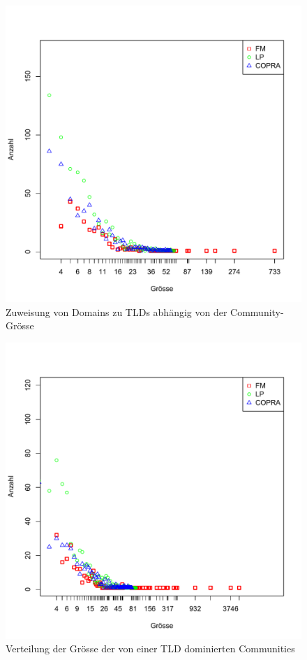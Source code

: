 \begin{figure}[h]
  \centering
  \includegraphics[scale=0.8]{images/tld_sure_dist.pdf}
  \caption{Zuweisung von Domains zu TLDs abh\"angig von der Community-Gr\"osse}
  \label{fig:tld-sure-ass-dist}
\end{figure}

\begin{figure}[h]
  \centering
  \includegraphics[scale=0.8]{images/tld_maybe_dist.pdf}
  \caption{Verteilung der Gr\"osse der von einer TLD dominierten Communities}
  \label{fig:tld-maybe-ass-dist}
\end{figure}

